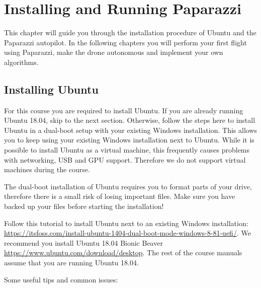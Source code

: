 \chapter{Installing and Running Paparazzi}
This chapter will guide you through the installation procedure of Ubuntu and the Paparazzi autopilot.
In the following chapters you will perform your first flight using Paparazzi, make the drone autonomous and implement your own algorithms.

\section{Installing Ubuntu}
For this course you are required to install Ubuntu.
If you are already running Ubuntu 18.04, skip to the next section.
Otherwise, follow the steps here to install Ubuntu in a dual-boot setup with your existing Windows installation.
This allows you to keep using your existing Windows installation next to Ubuntu.
While it is possible to install Ubuntu as a virtual machine, this frequently causes problems with networking, USB and GPU support. Therefore we do not support virtual machines during the course.

The dual-boot installation of Ubuntu requires you to format parts of your drive, therefore there is a small risk of losing important files.
Make sure you have backed up your files before starting the installation!

Follow this tutorial to install Ubuntu next to an existing Windows installation: \url{https://itsfoss.com/install-ubuntu-1404-dual-boot-mode-windows-8-81-uefi/}. We recommend you install Ubuntu 18.04 Bionic Beaver \url{https://www.ubuntu.com/download/desktop}. The rest of the course manuals assume that you are running Ubuntu 18.04.

Some useful tips and common issues:

